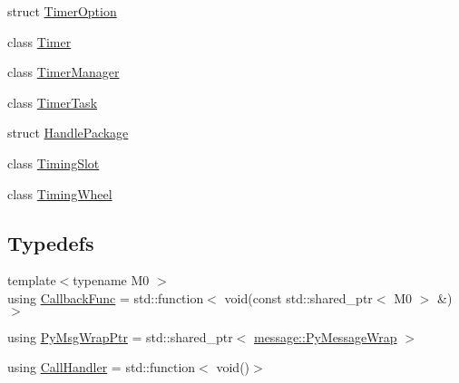 \begin{DoxyCompactItemize}
struct \hyperlink{structapollo_1_1cyber_1_1TimerOption}{Timer\-Option}
\item 
class \hyperlink{classapollo_1_1cyber_1_1Timer}{Timer}
\item 
class \hyperlink{classapollo_1_1cyber_1_1TimerManager}{Timer\-Manager}
\item 
class \hyperlink{classapollo_1_1cyber_1_1TimerTask}{Timer\-Task}
\item 
struct \hyperlink{structapollo_1_1cyber_1_1HandlePackage}{Handle\-Package}
\item 
class \hyperlink{classapollo_1_1cyber_1_1TimingSlot}{Timing\-Slot}
\item 
class \hyperlink{classapollo_1_1cyber_1_1TimingWheel}{Timing\-Wheel}
\end{DoxyCompactItemize}
\subsection*{Typedefs}
\begin{DoxyCompactItemize}
\item 
{\footnotesize template$<$typename M0 $>$ }\\using \hyperlink{namespaceapollo_1_1cyber_ac2b119de9ef52dbfcee3b6e8d497adc4}{Callback\-Func} = std\-::function$<$ void(const std\-::shared\-\_\-ptr$<$ M0 $>$ \&)$>$
\item 
using \hyperlink{namespaceapollo_1_1cyber_a1152fb39339af5618cb8e3a7afc89703}{Py\-Msg\-Wrap\-Ptr} = std\-::shared\-\_\-ptr$<$ \hyperlink{classapollo_1_1cyber_1_1message_1_1PyMessageWrap}{message\-::\-Py\-Message\-Wrap} $>$
\item 
using \hyperlink{namespaceapollo_1_1cyber_a73f7b365c4d923725c0a03bfb8c97978}{Call\-Handler} = std\-::function$<$ void()$>$
\end{DoxyCompactItemize}
